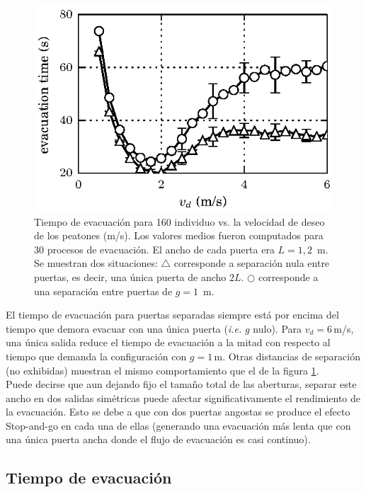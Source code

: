 \begin{figure}[H]
    \centering
    \includegraphics[scale=1.6]{figuras/fis.eps}
    \caption[width=5cm]{Tiempo de evacuación para 160 individuo vs. la velocidad de deseo de los peatones (m/s). Los valores medios fueron computados para 30 procesos de evacuación. El ancho de cada puerta era $L=1,2$~m. Se muestran dos situaciones:  $\bigtriangleup$ corresponde a separación nula entre puertas, es decir, una única puerta de ancho  $2L$. $\bigcirc$ corresponde a una separación entre puertas de $g=1$~m.}
    \label{fiss}
\end{figure}

El tiempo de evacuación para puertas separadas siempre está por encima del tiempo que demora evacuar con una única puerta (\emph{i.e.} $g$ nulo). Para $v_d=6\,$m/s, una única salida reduce el tiempo de evacuación a la mitad con respecto al tiempo que demanda la configuración con $g=1\,$m. Otras distancias de separación (no exhibidas) muestran el mismo comportamiento que el de la figura \ref{fiss}.\\

Puede decirse que aun dejando fijo el tamaño total de las aberturas, separar este ancho en dos salidas simétricas puede afectar significativamente el rendimiento de la evacuación. Esto se debe a que  con dos puertas angostas se produce el efecto Stop-and-go en cada una de ellas (generando una evacuación más lenta que con una única puerta ancha donde el flujo de evacuación es casi continuo). 

\subsection{Tiempo de evacuación}

